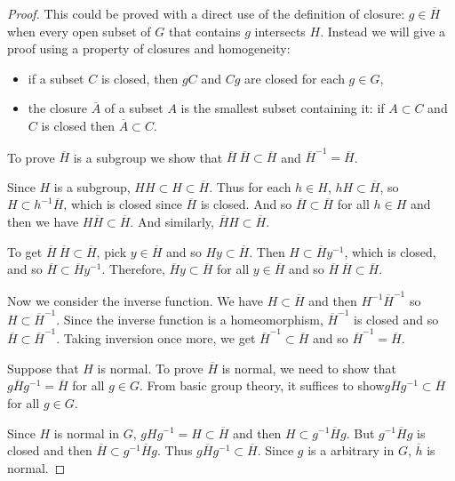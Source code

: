 \documentclass[12pt]{report}
\theoremstyle{definition}
\begin{document}
\begin{proof}
	This could be proved with a direct use of the definition of closure: $g \in \overline{H}$ when every open subset of $G$ that contains $g$ intersects $H$. Instead we will give a proof using a property of closures and homogeneity:
	\begin{itemize}
		\item if a subset $C$ is closed, then $gC$ and $Cg$ are closed for each $g \in G$,
		\item the closure $\overline{A}$ of a subset $A$ is the smallest subset containing it: if $A\subset C$ and $C$ is closed then $\overline{A}\subset C$.
	\end{itemize}

	To prove $\overline{H}$ is a subgroup we show that $\overline{H}~\overline{H}\subset \overline{H}$ and $\overline{H}^{-1}=\overline{H}$.

	Since $H$ is a subgroup, $HH\subset H\subset \overline{H}$. Thus for each $h\in H$, $hH\subset \overline{H}$, so $H\subset h^{-1}\overline{H}$, which is closed since $\overline{H}$ is closed. And so $\overline{H}\subset \overline{H}$ for all $h\in H$ and then we have $H\overline{H}\subset \overline{H}$. And similarly, $\overline{H}H\subset \overline{H}$.

	To get $\overline{H}~\overline{H}\subset \overline{H}$, pick $y\in \overline{H}$ and so $Hy\subset \overline{H}$. Then $H\subset \overline{H}y^{-1}$, which is closed, and so $\overline{H}\subset \overline{H}y^{-1}$. Therefore, $\overline{H}y\subset \overline{H}$ for all $y\in \overline{H}$ and so $\overline{H}~\overline{H}\subset \overline{H}$.


	Now we consider the inverse function. We have $H\subset \overline{H}$ and then $H^{-1} \overline{H}^{-1}$ so $H\subset \overline{H}^{-1}$. Since the inverse function is a homeomorphism, $\overline{H}^{-1}$ is closed and so $\overline{H}\subset \overline{H}^{-1}$. Taking inversion once more, we get $\overline{H}^{-1}\subset \overline{H}$ and so $\overline{H}^{-1}=\overline{H}$.


	Suppose that $H$ is normal. To prove $\overline{H}$ is normal, we need to show that $g\overline{H}g^{-1}=\overline{H}$ for all $g\in G$. From basic group theory, it suffices to show$g\overline{H}g^{-1}\subset \overline{H}$ for all $g\in G$.

	Since $H$ is normal in $G$, $gHg^{-1}=H\subset \overline{H}$ and then $H\subset g^{-1}\overline{H} g$. But $ g^{-1}\overline{H} g$ is closed and then $\overline{H}\subset g^{-1}\overline{H}g$. Thus $g\overline{H}g^{-1}\subset \overline{H}$. Since $g$ is a arbitrary in $G$, $\overline{h}$ is normal.
\end{proof}
\end{document}
